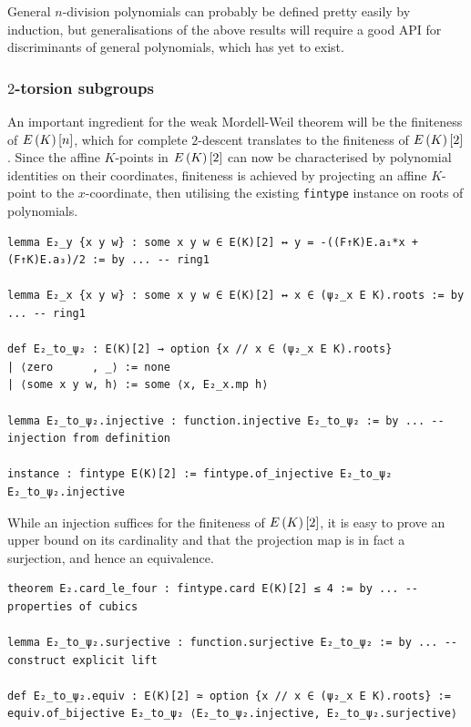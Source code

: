 General $ n $-division polynomials can probably be defined pretty easily by induction, but generalisations of the above results will require a good API for discriminants of general polynomials, which has yet to exist.

\pagebreak

\subsubsection{\texorpdfstring{$ 2 $}{2}-torsion subgroups}

An important ingredient for the weak Mordell-Weil theorem will be the finiteness of $ E\br{K}\sbr{n} $, which for complete $ 2 $-descent translates to the finiteness of $ E\br{K}\sbr{2} $. Since the affine $ K $-points in $ E\br{K}\sbr{2} $ can now be characterised by polynomial identities on their coordinates, finiteness is achieved by projecting an affine $ K $-point to the $ x $-coordinate, then utilising the existing \texttt{fintype} instance on roots of polynomials.

\begin{lstlisting}[frame=single]
lemma E₂_y {x y w} : some x y w ∈ E(K)[2] ↔ y = -((F↑K)E.a₁*x + (F↑K)E.a₃)/2 := by ... -- ring1

lemma E₂_x {x y w} : some x y w ∈ E(K)[2] ↔ x ∈ (ψ₂_x E K).roots := by ... -- ring1

def E₂_to_ψ₂ : E(K)[2] → option {x // x ∈ (ψ₂_x E K).roots}
| ⟨zero      , _⟩ := none
| ⟨some x y w, h⟩ := some ⟨x, E₂_x.mp h⟩

lemma E₂_to_ψ₂.injective : function.injective E₂_to_ψ₂ := by ... -- injection from definition

instance : fintype E(K)[2] := fintype.of_injective E₂_to_ψ₂ E₂_to_ψ₂.injective
\end{lstlisting}

While an injection suffices for the finiteness of $ E\br{K}\sbr{2} $, it is easy to prove an upper bound on its cardinality and that the projection map is in fact a surjection, and hence an equivalence.

\begin{lstlisting}[frame=single]
theorem E₂.card_le_four : fintype.card E(K)[2] ≤ 4 := by ... -- properties of cubics

lemma E₂_to_ψ₂.surjective : function.surjective E₂_to_ψ₂ := by ... -- construct explicit lift

def E₂_to_ψ₂.equiv : E(K)[2] ≃ option {x // x ∈ (ψ₂_x E K).roots} :=
equiv.of_bijective E₂_to_ψ₂ ⟨E₂_to_ψ₂.injective, E₂_to_ψ₂.surjective⟩
\end{lstlisting}

